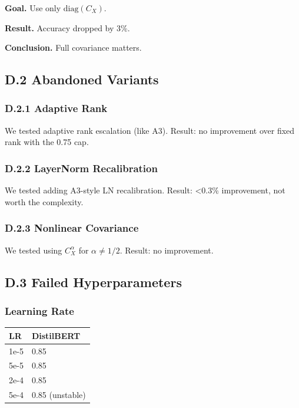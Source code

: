\textbf{Goal.} Use only $\mathrm{diag}(C_X)$.

\textbf{Result.} Accuracy dropped by 3\%.

\textbf{Conclusion.} Full covariance matters.

\subsection{D.2 Abandoned Variants}

\subsubsection{D.2.1 Adaptive Rank}

We tested adaptive rank escalation (like A3). Result: no improvement over 
fixed rank with the 0.75 cap.

\subsubsection{D.2.2 LayerNorm Recalibration}

We tested adding A3-style LN recalibration. Result: <0.3\% improvement, not 
worth the complexity.

\subsubsection{D.2.3 Nonlinear Covariance}

We tested using $C_X^\alpha$ for $\alpha \neq 1/2$. Result: no improvement.

\subsection{D.3 Failed Hyperparameters}

\subsubsection{Learning Rate}

\begin{table}[H]
\centering
\small
\begin{tabular}{ll}
\toprule
\textbf{LR} & \textbf{DistilBERT} \\
\midrule
1e-5 & 0.85 \\
5e-5 & 0.85 \\
2e-4 & 0.85 \\
5e-4 & 0.85 (unstable) \\
\bottomrule
\end{tabular}
\end{table}

